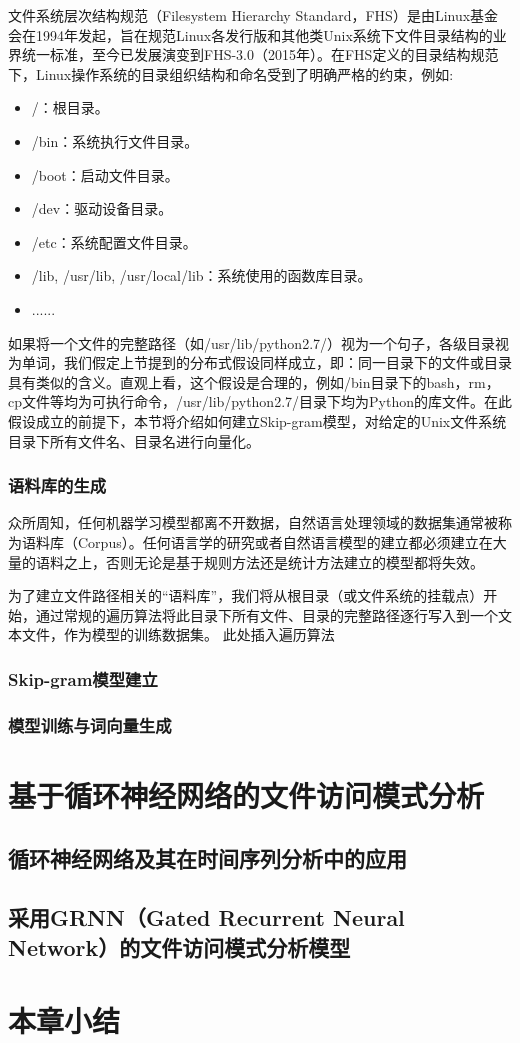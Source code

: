 文件系统层次结构规范（Filesystem Hierarchy Standard，FHS）\cite{fhs}是由Linux基金会在1994年发起，旨在规范Linux各发行版和其他类Unix系统下文件目录结构的业界统一标准，至今已发展演变到FHS-3.0（2015年）。在FHS定义的目录结构规范下，Linux操作系统的目录组织结构和命名受到了明确严格的约束，例如:
\begin{itemize}
    \item /：根目录。
    \item /bin：系统执行文件目录。
    \item /boot：启动文件目录。
    \item /dev：驱动设备目录。
    \item /etc：系统配置文件目录。
    \item /lib, /usr/lib, /usr/local/lib：系统使用的函数库目录。
    \item ......
\end{itemize}

如果将一个文件的完整路径（如/usr/lib/python2.7/）视为一个句子，各级目录视为单词，我们假定上节提到的分布式假设同样成立，即：同一目录下的文件或目录具有类似的含义。直观上看，这个假设是合理的，例如/bin目录下的bash，rm，cp文件等均为可执行命令，/usr/lib/python2.7/目录下均为Python的库文件。在此假设成立的前提下，本节将介绍如何建立Skip-gram模型，对给定的Unix文件系统目录下所有文件名、目录名进行向量化。

\subsubsection*{语料库的生成}
众所周知，任何机器学习模型都离不开数据，自然语言处理领域的数据集通常被称为语料库（Corpus）。任何语言学的研究或者自然语言模型的建立都必须建立在大量的语料之上，否则无论是基于规则方法还是统计方法建立的模型都将失效。

为了建立文件路径相关的“语料库”，我们将从根目录（或文件系统的挂载点）开始，通过常规的遍历算法将此目录下所有文件、目录的完整路径逐行写入到一个文本文件，作为模型的训练数据集。
{\color{red}此处插入遍历算法}

\subsubsection*{Skip-gram模型建立}

\subsubsection*{模型训练与词向量生成}



\section{基于循环神经网络的文件访问模式分析}
\subsection{循环神经网络及其在时间序列分析中的应用}
\subsection{采用GRNN（Gated Recurrent Neural Network）的文件访问模式分析模型}
\section{本章小结}